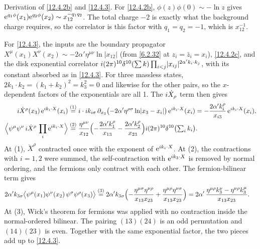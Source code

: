 \begin{tcolorbox}[breakable]
	\begin{remark}
		Derivation of \eqref{12.4.2b} and \eqref{12.4.3}. For \eqref{12.4.2b}, $\phi(z)\phi(0)\sim-\ln z$ gives $\mathrm{e}^{q_{1}\phi}(x_{1})\mathrm{e}^{q_{2}\phi}(x_{2})\sim x_{12}^{-q_{1}q_{2}}$. The total charge $-2$ is exactly what the background charge requires, so the correlator is this factor with $q_{1}=q_{2}=-1$, which is $x_{12}^{-1}$.

		For \eqref{12.4.3}, the inputs are the boundary propagator $X^{\mu}(x_{1})X^{\nu}(x_{2})\sim-2\alpha'\eta^{\mu\nu}\ln\lvert x_{12}\rvert$ (from \eqref{6.2.32} at $z_{i}=\bar z_{i}=x_{i}$), \eqref{12.4.2c}, and the disk exponential correlator $i(2\pi)^{10}\delta^{10}(\sum k)\prod_{i<j}\lvert x_{ij}\rvert^{2\alpha'k_{i}\cdot k_{j}}$, with its constant absorbed as in \eqref{12.4.3}. For three massless states, $2k_{1}\cdot k_{2}=(k_{1}+k_{2})^{2}=k_{3}^{2}=0$ and likewise for the other pairs, so the $x$-dependent factors of the exponentials are all 1. The $i\dot X_{\rho}$ term then gives
		\begin{align*}
			i\dot X^{\rho}(x_{3})\,\mathrm{e}^{i k_{i}\cdot X}(x_{i})
			&\overset{(1)}{=} i\cdot i k_{i\sigma}\,\partial_{x_{3}}\bigl(-2\alpha'\eta^{\rho\sigma}\ln\lvert x_{3}-x_{i}\rvert\bigr)\,\mathrm{e}^{i k_{i}\cdot X}(x_{i})
			=-\frac{2\alpha'k_{i}^{\rho}}{x_{i3}}\,\mathrm{e}^{i k_{i}\cdot X}(x_{i}) ,\\
			\Bigl\langle\psi^{\mu}\psi^{\nu}\,i\dot X^{\rho}\,\prod_{i}\mathrm{e}^{i k_{i}\cdot X}\Bigr\rangle
			&\overset{(2)}{=} \frac{\eta^{\mu\nu}}{x_{12}}\Bigl(-\frac{2\alpha'k_{1}^{\rho}}{x_{13}}-\frac{2\alpha'k_{2}^{\rho}}{x_{23}}\Bigr)i(2\pi)^{10}\delta^{10}\bigl(\textstyle\sum_{i} k_{i}\bigr) .
		\end{align*}
		At (1), $\dot X^{\rho}$ contracted once with the exponent of $\mathrm{e}^{i k_{i}\cdot X}$. At (2), the contractions with $i=1,2$ were summed, the self-contraction with $\mathrm{e}^{i k_{3}\cdot X}$ is removed by normal ordering, and the fermions only contract with each other. The fermion-bilinear term gives
		\begin{align*}
			2\alpha'k_{3\sigma}\bigl\langle\psi^{\mu}(x_{1})\psi^{\nu}(x_{2})\,\psi^{\sigma}\psi^{\rho}(x_{3})\bigr\rangle
			&\overset{(3)}{=} 2\alpha'k_{3\sigma}\Bigl(-\frac{\eta^{\mu\sigma}\eta^{\nu\rho}}{x_{13}x_{23}}+\frac{\eta^{\mu\rho}\eta^{\nu\sigma}}{x_{13}x_{23}}\Bigr)
			=2\alpha'\,\frac{\eta^{\mu\rho}k_{3}^{\nu}-\eta^{\nu\rho}k_{3}^{\mu}}{x_{13}x_{23}} .
		\end{align*}
		At (3), Wick's theorem for fermions was applied with no contraction inside the normal-ordered bilinear. The pairing $(13)(24)$ is an odd permutation and $(14)(23)$ is even. Together with the same exponential factor, the two pieces add up to \eqref{12.4.3}.


\end{remark}
\end{tcolorbox}
